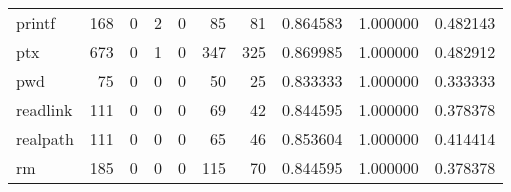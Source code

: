 \begin{tabular}{lrrrrrrrrr}
printf    &                                   168 &                                                  0 &                                                  2 &                                                  0 &                                                 85 &                                                 81 &                                           0.864583 &                               1.000000 &                             0.482143 \\
ptx       &                                   673 &                                                  0 &                                                  1 &                                                  0 &                                                347 &                                                325 &                                           0.869985 &                               1.000000 &                             0.482912 \\
pwd       &                                    75 &                                                  0 &                                                  0 &                                                  0 &                                                 50 &                                                 25 &                                           0.833333 &                               1.000000 &                             0.333333 \\
readlink  &                                   111 &                                                  0 &                                                  0 &                                                  0 &                                                 69 &                                                 42 &                                           0.844595 &                               1.000000 &                             0.378378 \\
realpath  &                                   111 &                                                  0 &                                                  0 &                                                  0 &                                                 65 &                                                 46 &                                           0.853604 &                               1.000000 &                             0.414414 \\
rm        &                                   185 &                                                  0 &                                                  0 &                                                  0 &                                                115 &                                                 70 &                                           0.844595 &                               1.000000 &                             0.378378 \\

\end{tabular}
